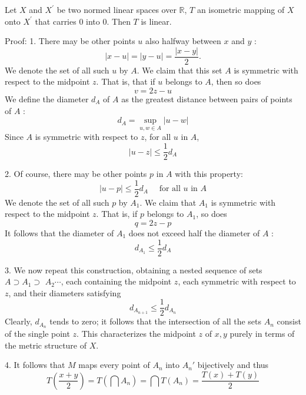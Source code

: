 \documentclass[12pt, oneside]{book}
\begin{document}
\begin{theorem}
    Let $X$ and $X^{\prime}$ be two normed linear spaces over $\mathbb{R}$, $T$ an isometric mapping of $X$ onto $X^{\prime}$ that carries $0$ into $0$. Then $T$ is linear.

    Proof:
    1. There may be other points $u$ also halfway between $x$ and $y$ :
    \begin{equation*}
        |x-u|=|y-u|=\frac{|x-y|}{2} .
    \end{equation*}
    We denote the set of all such $u$ by $A$. We claim that this set $A$ is symmetric with respect to the midpoint $z$. That is, that if $u$ belongs to $A$, then so does
    \begin{equation*}
        v=2 z-u
    \end{equation*}
    We define the diameter $d_A$ of $A$ as the greatest distance between pairs of points of $A$ :
    \begin{equation*}
        d_A=\sup _{u, w \in A}|u-w|
    \end{equation*}
    Since $A$ is symmetric with respect to $z$, for all $u$ in $A$,
    \begin{equation*}
        |u-z| \leq \frac{1}{2} d_A
    \end{equation*}

    2. Of course, there may be other points $p$ in $A$ with this property:
    \begin{equation*}
        |u-p| \leq \frac{1}{2} d_A \quad \text { for all } u \text { in } A
    \end{equation*}
    We denote the set of all such $p$ by $A_1$. We claim that $A_1$ is symmetric with respect to the midpoint $z$. That is, if $p$ belongs to $A_1$, so does
    \begin{equation*}
        q=2 z-p
    \end{equation*}
    It follows that the diameter of $A_1$ does not exceed half the diameter of $A$ :
    \begin{equation*}
        d_{A_1} \leq \frac{1}{2} d_A
    \end{equation*}

    3. We now repeat this construction, obtaining a nested sequence of sets $A \supset A_1 \supset$ $A_2 \cdots$, each containing the midpoint $z$, each symmetric with respect to $z$, and their diameters satisfying
    \begin{equation*}
        d_{A_{n+1}} \leq \frac{1}{2} d_{A_n}
    \end{equation*}
    Clearly, $d_{A_n}$ tends to zero; it follows that the intersection of all the sets $A_n$ consist of the single point $z$. This characterizes the midpoint $z$ of $x, y$ purely in terms of the metric structure of $X$.

    4. It follows that $M$
    maps every point of $A_n$ into $A_n'$ bijectively and thus
    \begin{equation*}
        T\left(\frac{x+y}{2}\right)
        =
        T\left(\bigcap A_n\right)
        =
        \bigcap T\left(A_n\right)
        =
        \frac{T\left(x\right)+ T\left(y\right)}{2}
    \end{equation*}
\end{theorem}
\end{document}
